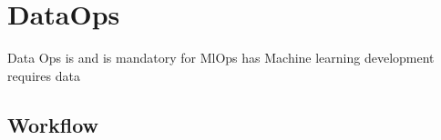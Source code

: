 \section{DataOps}\label{sec:dataops}
Data Ops is  and is mandatory for MlOps has Machine learning development requires data

\subsection{Workflow}


